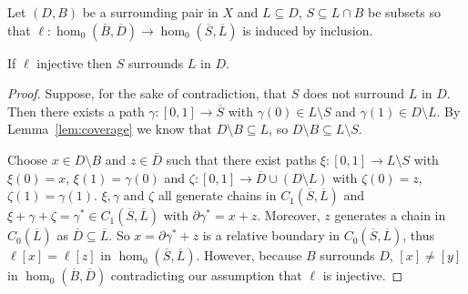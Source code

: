 \begin{lemma}\label{lem:cov_surrounds}
  Let $(D, B)$ be a surrounding pair in $X$ and $L\subseteq D$, $S\subseteq L\cap B$ be subsets so that $\ell: \hom_0(\overline{B}, \overline{D})\to \hom_0(\overline{S}, \overline{L})$ is induced by inclusion.

  If $\ell$ injective then $S$ surrounds $L$ in $D$.
\end{lemma}
\begin{proof}
  Suppose, for the sake of contradiction, that $S$ does not surround $L$ in $D$.
  Then there exists a path $\gamma : [0,1]\to\overline{S}$ with $\gamma(0)\in L\setminus S$ and $\gamma(1)\in D\setminus L$.
  By Lemma~\ref{lem:coverage} we know that $D\setminus B\subseteq L$, so $D\setminus B\subseteq L\setminus S$.

  Choose $x\in D\setminus B$ and $z\in \overline{D}$ such that there exist paths $\xi : [0,1]\to L\setminus S$ with $\xi(0) = x$, $\xi(1) = \gamma(0)$ and $\zeta : [0,1]\to \overline{D}\cup (D\setminus L)$ with $\zeta(0) = z$, $\zeta(1) = \gamma(1)$.
  $\xi, \gamma$ and $\zeta$ all generate chains in $C_1(\overline{S}, \overline{L})$ and $\xi + \gamma + \zeta = \gamma^*\in C_1(\overline{S}, \overline{L})$ with $\partial\gamma^* = x + z$.
  Moreover, $z$ generates a chain in $C_0(\overline{L})$ as $\overline{D}\subseteq\overline{L}$.
  So $x = \partial\gamma^* + z$ is a relative boundary in $C_0(\overline{S}, \overline{L})$, thus $\ell[x] = \ell[z]$ in $\hom_0(\overline{S}, \overline{L})$.
  However, because $B$ surrounds $D$, $[x]\neq [y]$ in $\hom_0(\overline{B}, \overline{D})$ contradicting our assumption that $\ell$ is injective.
\end{proof}
